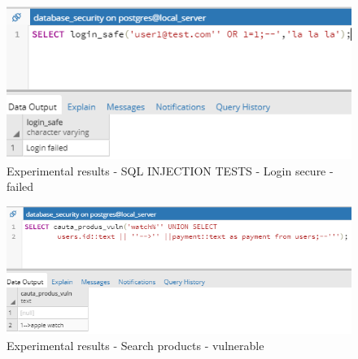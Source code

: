 \documentclass{article}
\begin{document}
\begin{figure}
\centering
\includegraphics[scale=1]{r7}
\caption{Experimental results - SQL INJECTION TESTS - Login secure - failed}
\end{figure}
\begin{figure}
\centering
\includegraphics[scale=1]{r8}
\caption{Experimental results - Search products - vulnerable}
\end{figure}
\end{document}
